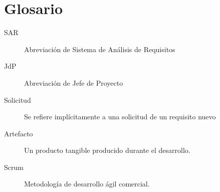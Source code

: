 \documentclass[a4paper, spanish]{article}
\begin{document}
\section{Glosario}
\begin{description}
  \item [SAR] Abreviación de Sistema de Análisis de Requisitos
  \item [JdP] Abreviación de Jefe de Proyecto
  \item [Solicitud] Se refiere implícitamente a una solicitud de un requisito nuevo
  \item [Artefacto] Un producto tangible producido durante el desarrollo.
  \item [Scrum] Metodología de desarrollo ágil comercial. 
\end{description}
\end{document}
